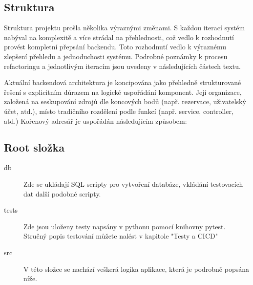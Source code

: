 
\subsection{Struktura}
Struktura projektu prošla několika výraznými změnami. S každou iterací systém nabýval na komplexitě a více strádal na přehlednosti, což vedlo k rozhodnutí provést kompletní přepsání backendu. Toto rozhodnutí vedlo k výraznému zlepšení přehledu a jednoduchosti systému. Podrobné poznámky k procesu refactoringu a jednotlivým iteracím jsou uvedeny v následujících částech textu.

Aktuální backendová architektura je koncipována jako přehledně strukturované řešení s explicitním důrazem na logické uspořádání komponent. Její organizace, založená na seskupování zdrojů dle koncových bodů (např. rezervace, uživatelský účet, atd.), místo tradičního rozdělení podle funkcí (např. service, controller, atd.)
Kořenový adresář je uspořádán následujícím způsobem:

\subsection{Root složka}
\begin{description}
    \item[db] 
    Zde se ukládají SQL scripty pro vytvoření databáze, vkládání testovacích dat další podobné scripty.
    \item[tests]  
    Zde jsou uloženy testy napsány v pythonu pomocí knihovny pytest. Stručný popis testování můžete nalést v kapitole "Testy a CICD"
    \item[src] 
    V této složce se nachází veškerá logika aplikace, která je podrobně popsána níže.
\end{description}

